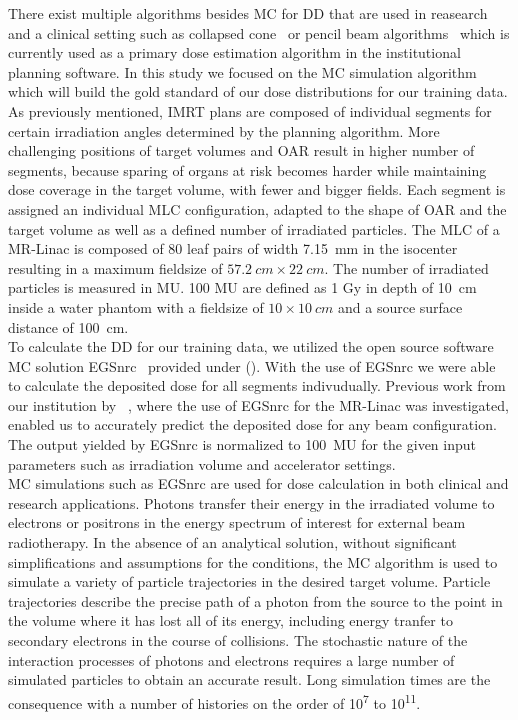 There exist multiple algorithms besides \acs{MC} for \acs{DD} that are used in reasearch and a clinical setting such as collapsed cone~\cite{ahnesjo_collapsed_1989} or pencil beam algorithms~\cite{mohan_differential_1986} which is currently used as a primary dose estimation algorithm in the institutional planning software.
In this study we focused on the \acs{MC} simulation algorithm which will build the gold standard of our dose distributions for our training data.\\
As previously mentioned, \acs{IMRT} plans are composed of individual segments for certain irradiation angles determined by the planning algorithm.
More challenging positions of target volumes and \acs{OAR} result in higher number of segments, because sparing of organs at risk becomes harder while maintaining dose coverage in the target volume, with fewer and bigger fields. 
Each segment is assigned an individual \acs{MLC} configuration, adapted to the shape of \acs{OAR} and the target volume as well as a defined number of irradiated particles.
The \acs{MLC} of a MR-Linac is composed of 80 leaf pairs of width 7.15~mm in the isocenter resulting in a maximum fieldsize of $57.2~cm \times 22~cm$.
The number of irradiated particles is measured in \ac{MU}.
100 \acs{MU} are defined as 1 Gy in depth of 10~cm inside a water phantom with a fieldsize of $10 \times 10~cm$ and a source surface distance of 100~cm.\\
To calculate the \acs{DD} for our training data, we utilized the open source software \acs{MC} solution EGSnrc~\cite{noauthor_nrc-cnrcegsnrc_2021} provided under ().
With the use of EGSnrc we were able to calculate the deposited dose for all segments indivudually. 
Previous work from our institution by \citeauthor{friedel_development_2019}~\cite{friedel_development_2019}, where the use of EGSnrc for the MR-Linac was investigated, enabled us to accurately predict the deposited dose for any beam configuration. 
The output yielded by EGSnrc is normalized to 100~\acs{MU} for the given input parameters such as irradiation volume and accelerator settings.\\

\acs{MC} simulations such as EGSnrc are used for dose calculation in both clinical and research applications.
Photons transfer their energy in the irradiated volume to electrons or positrons in the energy spectrum of interest for external beam radiotherapy. 
In the absence of an analytical solution, without significant simplifications and assumptions for the conditions, the \acs{MC} algorithm is used to simulate a variety of particle trajectories in the desired target volume.
Particle trajectories describe the precise path of a photon from the source to the point in the volume where it has lost all of its energy, including energy tranfer to secondary electrons in the course of collisions.
The stochastic nature of the interaction processes of photons and electrons requires a large number of simulated particles to obtain an accurate result. 
Long simulation times are the consequence with a number of histories on the order of 10\textsuperscript{7} to 10\textsuperscript{11}.